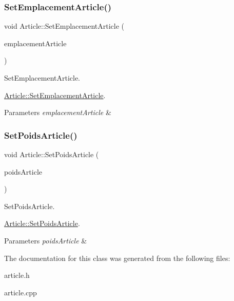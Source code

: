 \subsubsection{\texorpdfstring{Set\+Emplacement\+Article()}{SetEmplacementArticle()}}
{\footnotesize\ttfamily void Article\+::\+Set\+Emplacement\+Article (\begin{DoxyParamCaption}\item[{Q\+String}]{emplacement\+Article }\end{DoxyParamCaption})}



Set\+Emplacement\+Article. 

\mbox{\hyperlink{class_article_ae543837747d1022bd91afb5ca7e7cc32}{Article\+::\+Set\+Emplacement\+Article}}.


\begin{DoxyParams}{Parameters}
{\em emplacement\+Article} & \\
\hline
\end{DoxyParams}
\mbox{\label{class_article_af2412d92eb7d53ca7566755a900653c0}} 
\subsubsection{\texorpdfstring{Set\+Poids\+Article()}{SetPoidsArticle()}}
{\footnotesize\ttfamily void Article\+::\+Set\+Poids\+Article (\begin{DoxyParamCaption}\item[{int}]{poids\+Article }\end{DoxyParamCaption})}



Set\+Poids\+Article. 

\mbox{\hyperlink{class_article_af2412d92eb7d53ca7566755a900653c0}{Article\+::\+Set\+Poids\+Article}}.


\begin{DoxyParams}{Parameters}
{\em poids\+Article} & \\
\hline
\end{DoxyParams}


The documentation for this class was generated from the following files\+:\begin{DoxyCompactItemize}
\item 
article.\+h\item 
article.\+cpp\end{DoxyCompactItemize}
